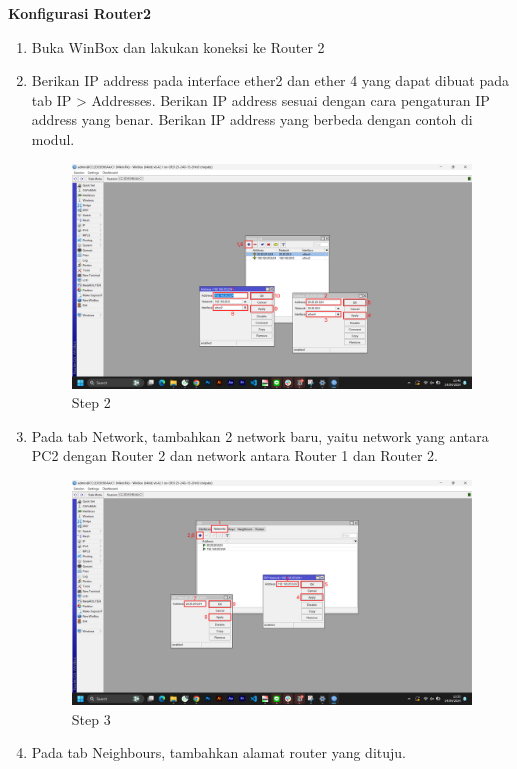 \begin{center}
	\textbf{Konfigurasi Router2}
	\begin{enumerate}
		\item Buka WinBox dan lakukan koneksi ke Router 2
		\item Berikan IP address pada interface ether2 dan ether 4 yang dapat dibuat pada tab IP > Addresses. Berikan IP address sesuai dengan cara pengaturan IP address yang benar. Berikan IP address yang berbeda dengan contoh di modul.
		\begin{figure}[H]
			\centering
			\includegraphics[width=0.9\linewidth]{P2/img/per1/pc2/Step 2.png}
			\caption{Step 2}
			\label{fig:Step 2(Per.2 PC2)}
		\end{figure}
		\item Pada tab Network, tambahkan 2 network baru, yaitu network yang antara PC2 dengan Router 2 dan network antara Router 1 dan Router 2.
		\begin{figure}[H]
			\centering
			\includegraphics[width=0.9\linewidth]{P2/img/per2/pc2/Step 4.png}
			\caption{Step 3}
			\label{fig:Step 3(Per.2 PC2)}
		\end{figure}
		\item Pada tab Neighbours, tambahkan alamat router yang dituju.
		\begin{figure}[H]

\end{figure}
\end{enumerate}
\end{center}
